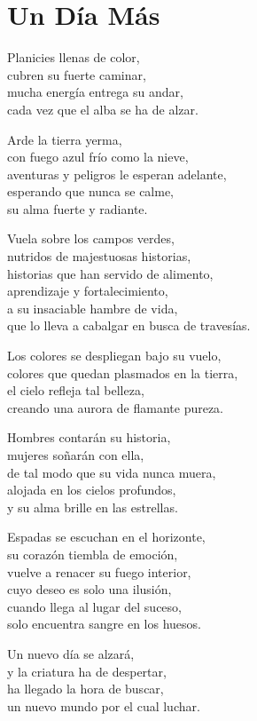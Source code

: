 \section*{Un Día Más}
\label{Un_dia_mas}

\vspace{1em}
\begin{center}
Planicies llenas de color,\\
cubren su fuerte caminar,\\
mucha energía entrega su andar,\\
cada vez que el alba se ha de alzar.

\vspace{1em}
Arde la tierra yerma,\\
con fuego azul frío como la nieve,\\
aventuras y peligros le esperan adelante,\\
esperando que nunca se calme,\\
su alma fuerte y radiante.

\vspace{1em}
Vuela sobre los campos verdes,\\
nutridos de majestuosas historias,\\
historias que han servido de alimento,\\
aprendizaje y fortalecimiento,\\
a su insaciable hambre de vida,\\
que lo lleva a cabalgar en busca de travesías.

\vspace{1em}
Los colores se despliegan bajo su vuelo,\\
colores que quedan plasmados en la tierra,\\
el cielo refleja tal belleza,\\
creando una aurora de flamante pureza.

\vspace{1em}
Hombres contarán su historia,\\
mujeres soñarán con ella,\\
de tal modo que su vida nunca muera,\\
alojada en los cielos profundos,\\
y su alma brille en las estrellas.

\vspace{1em}
Espadas se escuchan en el horizonte,\\
su corazón tiembla de emoción,\\
vuelve a renacer su fuego interior,\\
cuyo deseo es solo una ilusión,\\
cuando llega al lugar del suceso,\\
solo encuentra sangre en los huesos.

\vspace{1em}
Un nuevo día se alzará,\\
y la criatura ha de despertar,\\
ha llegado la hora de buscar,\\
un nuevo mundo por el cual luchar.


\end{center}




